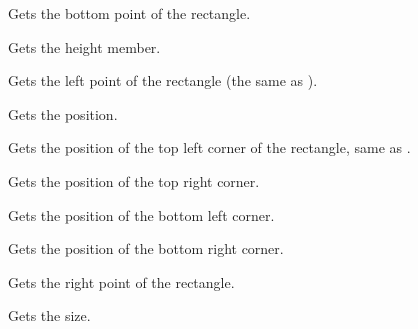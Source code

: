 Gets the bottom point of the rectangle.


\label{wxrectgetheight}


Gets the height member.


\label{wxrectgetleft}


Gets the left point of the rectangle (the same as ).


\label{wxrectgetposition}


Gets the position.


\label{wxrectgettopleft}


Gets the position of the top left corner of the rectangle, same as 
.


\label{wxrectgettopright}


Gets the position of the top right corner.


\label{wxrectgetbottomleft}


Gets the position of the bottom left corner.


\label{wxrectgetbottomright}


Gets the position of the bottom right corner.


\label{wxrectgetright}


Gets the right point of the rectangle.


\label{wxrectgetsize}


Gets the size.




